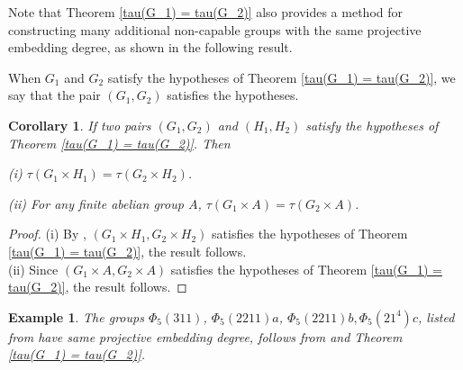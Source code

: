 \documentclass[a4paper,11pt]{amsart}
\numberwithin{equation}{section}
\numberwithin{equation}{subsection}
\newtheorem{corollary}[theorem]{Corollary}
\newtheorem{example}[theorem]{Example}
\newcommand{\C}{\mathbb{C}}
\newcommand{\Ho}{{\mathrm{H}}}
\newcommand{\Nayak}[1]{{\color{red} #1}}
\newcommand{\poonam}[1]{{\color{blue} #1}}
\begin{document}
Note that Theorem \ref{tau(G_1) = tau(G_2)} also provides a method for constructing many additional non-capable groups with the same projective embedding degree, as shown in the following result.

When $G_1$ and $G_2$ satisfy the hypotheses of Theorem \ref{tau(G_1) = tau(G_2)},
we say that the pair $(G_1, G_2)$ satisfies the hypotheses.
\begin{corollary} If two pairs $(G_1, G_2)$ and $(H_1, H_2)$ satisfy the hypotheses of Theorem \ref{tau(G_1) = tau(G_2)}. Then
	
	(i) $\tau(G_1 \times H_1) = \tau(G_2 \times H_2)$.
	
	(ii) For any finite abelian group $A$, $\tau(G_1 \times A) = \tau(G_2 \times A)$. %
\end{corollary} 

\begin{proof}
	(i) By \cite[Proof of Corollary 1.5]{sabnam}, $(G_1 \times H_1, G_2 \times H_2)$ satisfies the hypotheses of Theorem \ref{tau(G_1) = tau(G_2)}, the result follows. \\ 
	(ii) Since $(G_1 \times A, G_2 \times A)$ satisfies the hypotheses of Theorem \ref{tau(G_1) = tau(G_2)}, the result follows.  %
\end{proof}

\begin{example} The groups $\Phi_5(311)$, $\Phi_5(2211)a$, $\Phi_5(2211)b, \Phi_5(21^4)c$, listed from \cite{james} have same projective embedding degree, follows from \cite[Proof of Theorem 3.4]{sabnam} and Theorem \ref{tau(G_1) = tau(G_2)}. 
\end{example} 




\end{document}

